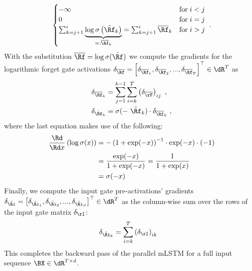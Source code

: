 \documentclass[dvipsnames]{article}
\begin{document}
\begin{appendix}
\begin{equation}
\begin{cases}
        -\infty                                                  & \text{for} \; i < j \\
        0 & \text{for} \;  i = j \\
        \sum_{k=j+1}^{i} \underbrace{\log \sigma\left(\tilde{\Rf}_k\right)}_{=: \overline{\Rf}_k} =  \sum_{k=j+1}^{i} \overline{\Rf}_k & \text{for} \; i > j
    \end{cases} \ .
\end{equation}
With the substitution $\overline{\bm{\Rf}} = \log \sigma(\tilde{\bm{\Rf}})$ we compute the gradients
for the logarithmic forget gate activations $\delta_{\overline{\bm{\Rf}}} = \left[\delta_{\overline{\Rf}_1}, \delta_{\overline{\Rf}_2}, ..., \delta_{\overline{\Rf}_T} \right]^\top \in \dR^T$
as
\begin{align}
    \delta_{\overline{\Rf}_k} &= \sum_{j=1}^{k-1} \sum_{i=k}^{T} \left(\delta_{\overline{\bm{\rF}}}\right)_{ij} \ , \\
    \delta_{\tilde{\Rf}_k} &= \sigma(- \ \tilde{\Rf}_k) \cdot \delta_{\overline{\Rf}_k} \ ,
\end{align}
\raggedbottom
where the last equation makes use of the following:
\begin{align}
    \begin{split}
    \frac{\Rd}{\Rd x}\left(\log \sigma(x)\right) &= - \left(1 + \exp(-x)\right)^{-1} \cdot \exp(-x) \cdot (-1) \\
    &= \frac{\exp(-x)}{1+\exp(-x)} = \frac{1}{1+\exp(x)} \\
    &=\sigma(-x)
    \end{split}
\end{align}
Finally, we compute the input gate pre-activations' gradients $\delta_{\tilde{\bm{\Ri}}} = \left[\delta_{\tilde{\Ri}_1}, \delta_{\tilde{\Ri}_2}, ..., \delta_{\tilde{\Ri}_S} \right]^\top \in \dR^T$
as the column-wise sum over the rows of the input gate matrix $\delta_{\bm{\rI}}$:
\begin{align}
    \delta_{\tilde{\Ri}_k} &= \sum_{i=k}^{T} \left(\delta_{\bm{\rI}}\right)_{ik}
\end{align}
This completes the backward pass of the parallel mLSTM for a full input sequence $\BX \in \dR^{T \times d}$.
\nopagebreak

\end{appendix}
\end{document}

